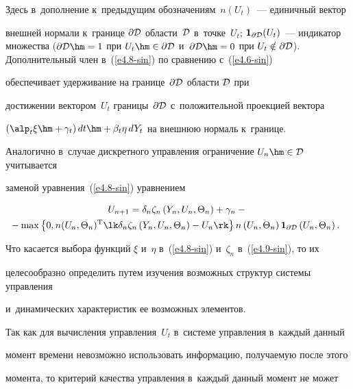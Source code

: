Здесь в~дополнение к~предыдущим обозначениям~$n(U_t)$~--- единичный вектор 

внешней нормали к~границе $\partial \cD$ области~$\cD$ в~точке~$U_t$; $\mathbf{1}_{\partial 

\cD} (U_t)$~--- индикатор множества ($\partial \cD\hm=1$ при $U_t\hm\in \partial \cD$ и~$\partial 

\cD\hm=0$ при $U_t\notin \partial \cD$). Дополнительный член в~(\ref{e4.8-sin}) по сравнению с~(\ref{e4.6-sin}) 

обеспечивает удерживание на границе~$\partial {\cal D}$ области ${\cal D}$ при 

достижении вектором~$U_t$ границы~$\partial {\cal D}$ с~положительной проекцией вектора 

$(\alp_t\xi \hm+ \gamma_t) \,dt \hm+ \beta_t\eta\, dY_t$ на внешнюю нормаль к~границе.



Аналогично в~случае дискретного управления ограничение  $U_n\hm\in \cD$ учитывается 

заменой уравнения~(\ref{e4.8-sin}) уравнением

\begin{multline}

U_{n+1} = \delta_n \zeta_n \left(Y_n, U_n, \Theta_n\right) + \gamma_n -{}\\

\hspace*{-3mm}{}-

\max \left\{ 0, n(U_n,\Theta_n)^{\mathrm{T}} \lk \delta_n \zeta_n \left(Y_n, U_n,\Theta_n\right) - U_n \rk \right\} n\left(U_n,\Theta_n\right) \mathbf{1}_{\partial \cD} 

\left(U_n,\Theta_n\right).\!\label{e4.9-sin}

\end{multline}

Что касается выбора функций  $\xi$ и~$\eta$ в~(\ref{e4.8-sin}) и~$\zeta_n$ в~(\ref{e4.9-sin}), то их 

целесообразно определить путем изучения возможных структур системы управ\-ле\-ния 

и~динамических характеристик ее возможных элементов.



Так как для вычисления управления~$U_t$ в~сис\-те\-ме управ\-ле\-ния в~каждый данный 

момент времени невозможно использовать информацию, получаемую после этого 

момента, то критерий качества управ\-ле\-ния в~каждый данный момент не может 

